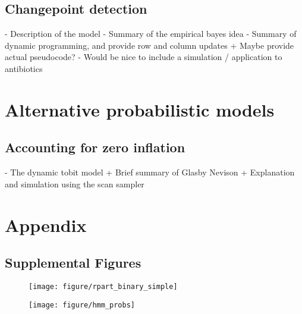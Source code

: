 \documentclass{article}
\begin{document}
\subsection{Changepoint detection}

- Description of the model
- Summary of the empirical bayes idea
- Summary of dynamic programming, and provide row and column updates
  + Maybe provide actual pseudocode?
- Would be nice to include a simulation / application to antibiotics


\section{Alternative probabilistic models}
\label{sec:alternative_probabilistic_models}
\subsection{Accounting for zero inflation}

- The dynamic tobit model
  + Brief summary of Glasby Nevison
  + Explanation and simulation using the scan sampler




\section{Appendix}
\label{sec:appendix}

\subsection{Supplemental Figures}
\label{subsec:supplemental_figures}

\begin{figure}[ht]
  \centering
  \caption{\label{fig:rpart_simple} }
\end{figure}

\begin{figure}[ht]
  \centering
  \caption{\label{fig:label} }
\end{figure}

\begin{figure}[ht]
  \centering
  \caption{\label{fig:rpart_complex_3} }
\end{figure}

\begin{figure}[ht]
  \centering
  \texttt{[image: figure/rpart\_binary\_simple]}
  \caption{\label{fig:rpart_binary_simple} }
\end{figure}

\begin{figure}[ht]
  \centering
  \caption{\label{fig:rpart_conditional} }
\end{figure}

\begin{figure}[ht]
  \centering
  \texttt{[image: figure/hmm\_probs]}
  \caption{\label{fig:hmm_probs} }
\end{figure}
\end{document}
